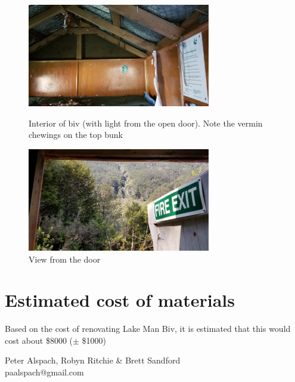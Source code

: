 \documentclass[12pt]{article} %
\begin{document}
\begin{figure}[ht]
\begin{minipage}{.5\linewidth}
\begin{flushleft}
   \includegraphics[width=8cm]{LucretiaBivReport23Nov2019Photo7}
   \caption{Interior of biv (with light from the open door).  Note the vermin chewings on the top bunk}
   \label{LB07}
\end{flushleft}
\end{minipage}
\begin{minipage}{.5\linewidth}
\begin{center}
   \includegraphics[width=8cm]{LucretiaBivReport23Nov2019Photo8}
   \caption{View from the door}
   \label{LB08}
\end{center}
\end{minipage}
\end{figure}

\section{Estimated cost of materials}

Based on the cost of renovating Lake Man Biv, it is estimated that this would cost about \$8000 ($\pm$ \$1000)

\begin{flushright}
Peter Alspach, Robyn Ritchie \& Brett Sandford\\
paalspach@gmail.com
\end{flushright}
\end{document}
